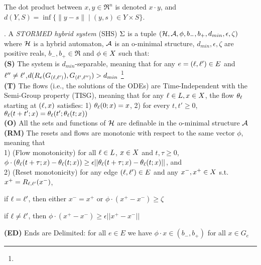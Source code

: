 %
The dot product between $x,y\in \Re^n$ is denoted $x \cdot y$, and $d(Y,S)=\inf \{ \|y-s\| \;|\; (y,s) \in Y\times S \}$.
\begin{defn}\cite{VladimerouPVD08_STORMED}.
	\label{defn:stormed system}	
	A \emph{STORMED hybrid system} (SHS) $\Sigma$ is a tuple $(\mathcal{H},\mathcal{A}, \phi,b_-,b_+, d_{min}, \epsilon,\zeta)$ where $\mathcal{H}$ is a hybrid automaton, $\mathcal{A}$ is an o-minimal structure, $d_{min}, \epsilon, \zeta$ are positive reals, $b_-,b_+ \in \Re$ and $\phi \in X$ such that:
	\\
	\textbf{(S)} The system is $d_{min}$-separable, meaning that for any $e=(\ell, \ell ')\in E$ and $\ell ''\neq \ell'$,$d(R_e(G_{(\ell ,\ell ')}), G_{(\ell' ,\ell '')})>d_{min}$
	\footnote{}
	\\
	\textbf{(T)} The flows (i.e., the solutions of the ODEs) are Time-Independent with the Semi-Group property (TISG), meaning that for any $\ell \in L, x \in X$, the flow $\theta_\ell$ starting at $(\ell , x)$ satisfies: 1) $\theta_{\ell}(0;x) = x$, 2) for every $t,t' \geq 0$, $\theta_{\ell}(t+t';x) = \theta_{\ell}(t'; \theta_\ell(t;x))$
	\\
	\textbf{(O)} All the sets and functions of $\mathcal{H}$ are definable in the o-minimal structure $\mathcal{A}$
	\\
	\textbf{(RM)} The resets and flows are monotonic with respect to the same vector $\phi$, meaning that \\
	1) (Flow monotonicity) for all $\ell \in L$, $x \in X$ and $t,\tau \geq 0$, $\phi \cdot (\theta_\ell (t+\tau;x) - \theta_\ell (t;x) ) \geq \epsilon ||\theta_\ell (t+\tau;x) - \theta_\ell (t;x) ||$, 
	and \\
	2) (Reset monotonicity) for any edge $(\ell,\ell') \in E$ and any $x^-,x^+ \in X$ s.t. $x^+ = R_{\ell ,\ell'}(x^-)$, 
	\begin{compactenum}
		\item if $\ell = \ell'$, then either $x^-=x^+$ or $\phi \cdot (x^+-x^-)\geq \zeta$
		\item if $\ell \neq \ell'$, then $\phi\cdot (x^+-x^-) \geq \epsilon ||x^+-x^-||$
	\end{compactenum}

	\textbf{(ED)} Ends are Delimited: for all $e \in E$ we have $\phi \cdot x \in (b_- , b_+)$ for all $x \in G_{e}$
\end{defn}
